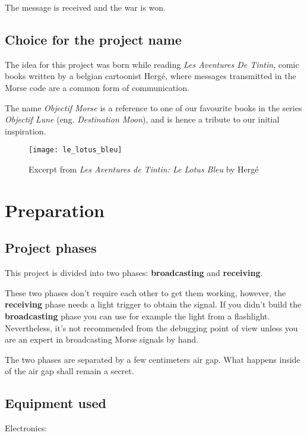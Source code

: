 \documentclass[12pt]{report}
\begin{document}
The message is received and the war is won.

\subsection{Choice for the project name}

The idea for this project was born while reading \textit{Les Aventures De Tintin}, comic books written by a belgian cartoonist Hergé, where messages transmitted in the Morse code are a common form of communication. 

The name \textit{Objectif Morse} is a reference to one of our favourite books in the series \textit{Objectif Lune} \cite{objectif_lune} (eng. \textit{Destination Moon}), and is hence a tribute to our initial inspiration.

\begin{figure}[H]
\centering\texttt{[image: le\_lotus\_bleu]}
\caption{Excerpt from \textit{Les Aventures de Tintin: Le Lotus Bleu} by Hergé \cite{le_lotus_bleu}}			
\label{fig:tintin}
\end{figure}

\section{Preparation} \label{sec:equip}

\subsection{Project phases}

This project is divided into two phases: \textbf{broadcasting} and \textbf{receiving}. 

These two phases don't require each other to get them working, however, the \textbf{receiving} phase needs a light trigger to obtain the signal. If you didn't build the  \textbf{broadcasting} phase you can use for example the light from a flashlight. Nevertheless, it's not recommended from the debugging point of view unless you are an expert in broadcasting Morse signals by hand.

The two phases are separated by a few centimeters air gap. What happens inside of the air gap shall remain a secret.

\subsection{Equipment used} 

Electronics:
\end{document}
